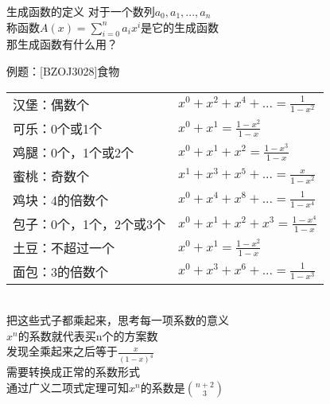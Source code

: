 \documentclass{beamer}
\begin{document}
\begin{frame}{生成函数的定义}
对于一个数列$a_0,a_1,...,a_n$\\
称函数$A(x)=\sum_{i=0}^{n}a_{i}x^{i}$是它的生成函数\\
\pause
那生成函数有什么用？\\
\end{frame}

\begin{frame}{例题：[BZOJ3028]食物}
\scriptsize
\begin{tabular}{ll}
汉堡：偶数个 & $x^0+x^2+x^4+...=\frac{1}{1-x^2}$\\
可乐：0个或1个 & $x^0+x^1=\frac{1-x^2}{1-x}$\\
鸡腿：0个，1个或2个 & $x^0+x^1+x^2=\frac{1-x^3}{1-x}$\\
蜜桃：奇数个 & $x^1+x^3+x^5+...=\frac{x}{1-x^2}$\\
鸡块：4的倍数个 & $x^0+x^4+x^8+...=\frac{1}{1-x^4}$\\
包子：0个，1个，2个或3个 & $x^0+x^1+x^2+x^3=\frac{1-x^4}{1-x}$\\
土豆：不超过一个 & $x^0+x^1=\frac{1-x^2}{1-x}$\\
面包：3的倍数个 & $x^0+x^3+x^6+...=\frac{1}{1-x^3}$\\
\end{tabular}\\
\normalsize
{}
\pause
{}
\pause
{}
\pause
把这些式子都乘起来，思考每一项系数的意义\\
\pause
$x^n$的系数就代表买n个的方案数\\
\pause
发现全乘起来之后等于$\frac{x}{(1-x)^4}$\\
需要转换成正常的系数形式\\
通过广义二项式定理可知$x^n$的系数是$\binom{n+2}{3}$
\end{frame}
\end{document}

